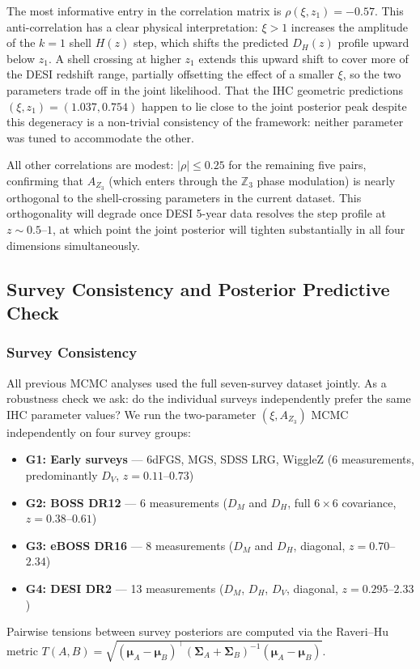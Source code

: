 \documentclass[12pt,a4paper]{article}
\begin{document}
The most informative entry in the correlation matrix is
$\rho(\xi, z_1) = -0.57$.  This anti-correlation has a clear physical
interpretation: $\xi > 1$ increases the amplitude of the $k=1$ shell
$H(z)$ step, which shifts the predicted $D_H(z)$ profile upward below $z_1$.
A shell crossing at higher $z_1$ extends this upward shift to cover more of
the DESI redshift range, partially offsetting the effect of a smaller $\xi$,
so the two parameters trade off in the joint likelihood.  That the IHC geometric predictions
$(\xi, z_1) = (1.037, 0.754)$ happen to lie close to the joint posterior peak
despite this degeneracy is a non-trivial consistency of the framework: neither
parameter was tuned to accommodate the other.

All other correlations are modest: $|\rho| \leq 0.25$ for the remaining five
pairs, confirming that $A_{Z_3}$ (which enters through the $\mathbb{Z}_3$
phase modulation) is nearly orthogonal to the shell-crossing parameters in the
current dataset.  This orthogonality will degrade once DESI 5-year data resolves
the step profile at $z \sim 0.5$--$1$, at which point the joint posterior will
tighten substantially in all four dimensions simultaneously.

\subsection{Survey Consistency and Posterior Predictive Check}
\label{sec:validation_suite}

\subsubsection{Survey Consistency}

All previous MCMC analyses used the full seven-survey dataset jointly.
As a robustness check we ask: do the individual surveys independently prefer the
same IHC parameter values?  We run the two-parameter $(\xi, A_{Z_3})$ MCMC
independently on four survey groups:
\begin{itemize}
  \item \textbf{G1: Early surveys} — 6dFGS, MGS, SDSS LRG, WiggleZ
        (6 measurements, predominantly $D_V$, $z = 0.11$--$0.73$)
  \item \textbf{G2: BOSS DR12} — 6 measurements ($D_M$ and $D_H$,
        full $6\times6$ covariance, $z = 0.38$--$0.61$)
  \item \textbf{G3: eBOSS DR16} — 8 measurements ($D_M$ and $D_H$,
        diagonal, $z = 0.70$--$2.34$)
  \item \textbf{G4: DESI DR2} — 13 measurements ($D_M$, $D_H$, $D_V$,
        diagonal, $z = 0.295$--$2.33$)
\end{itemize}
Pairwise tensions between survey posteriors are computed via the
Raveri--Hu metric \citep{RaveriHu2019} $T(A,B) = \sqrt{(\boldsymbol{\mu}_A - \boldsymbol{\mu}_B)^\top
(\boldsymbol{\Sigma}_A + \boldsymbol{\Sigma}_B)^{-1}
(\boldsymbol{\mu}_A - \boldsymbol{\mu}_B)}$.
\end{document}
